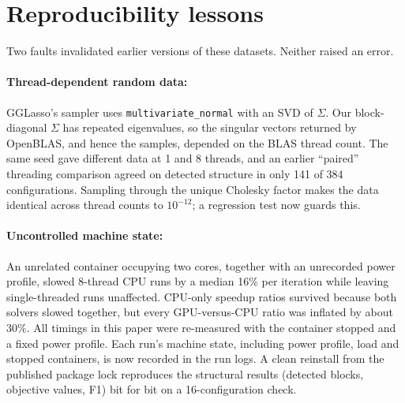 \documentclass[pdflatex,sn-mathphys-num]{sn-jnl}
\begin{document}
\section{Reproducibility lessons}
\label{sec:repro}
Two faults invalidated earlier versions of these datasets. Neither raised an
error.
\paragraph{Thread-dependent random data:} GGLasso's sampler uses
\texttt{multivariate\_normal} with an SVD of $\Sigma$. Our block-diagonal
$\Sigma$ has repeated eigenvalues, so the singular vectors returned by
OpenBLAS, and hence the samples, depended on the BLAS thread count. The same
seed gave different data at 1 and 8 threads, and an earlier ``paired''
threading comparison agreed on detected structure in only 141 of 384
configurations. Sampling through the unique Cholesky factor makes the data
identical across thread counts to $10^{-12}$; a regression test now guards
this.
\paragraph{Uncontrolled machine state:} An unrelated container occupying two
cores, together with an unrecorded power profile, slowed 8-thread CPU runs
by a median 16\% per iteration while leaving single-threaded runs
unaffected. CPU-only speedup ratios survived because both solvers slowed
together, but every GPU-versus-CPU ratio was inflated by about 30\%. All timings in this paper were re-measured with the container stopped and a
fixed power profile. Each run's machine state, including power profile, load
and stopped containers, is now recorded in the run logs.
A clean reinstall from the published package lock reproduces the
structural results (detected blocks, objective values, F1) bit for bit on a
16-configuration check.
\end{document}
